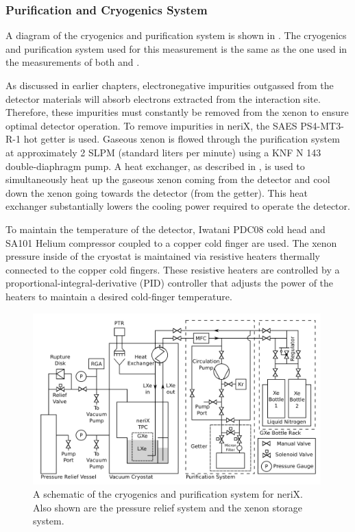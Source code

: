 \subsubsection{Purification and Cryogenics System}
\label{sec:nerix_cryo_pur}

A diagram of the cryogenics and purification system is shown in .  The cryogenics and purification system used for this measurement is the same as the one used in the measurements of both  and .

As discussed in earlier chapters, electronegative impurities outgassed from the detector materials will absorb electrons extracted from the interaction site.  Therefore, these impurities must constantly be removed from the xenon to ensure optimal detector operation.  To remove impurities in neriX, the SAES PS4-MT3-R-1 hot getter is used.  Gaseous xenon is flowed through the purification system at approximately 2 SLPM (standard liters per minute) using a KNF N 143 double-diaphragm pump.  A heat exchanger, as described in , is used to simultaneously heat up the gaseous xenon coming from the detector and cool down the xenon going towards the detector (from the getter).  This heat exchanger substantially lowers the cooling power required to operate the detector.

To maintain the temperature of the detector, Iwatani PDC08 cold head and SA101 Helium compressor coupled to a copper cold finger are used.  The xenon pressure inside of the cryostat is maintained via resistive heaters thermally connected to the copper cold fingers.  These resistive heaters are controlled by a proportional-integral-derivative (PID) controller that adjusts the power of the heaters to maintain a desired cold-finger temperature.


\begin{figure}[t]
        \centering
	\includegraphics[width=0.99\textwidth]{nerix_cryo_pur}
	\caption{A schematic of the cryogenics and purification system for neriX.  Also shown are the pressure relief system and the xenon storage system.}
	\label{fig:nerix_cryo_pur}
\end{figure}



